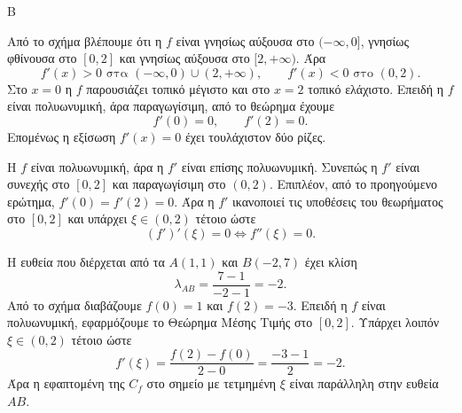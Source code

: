 

\begin{thema}{Β}
\begin{erwthma}
\item Από το σχήμα βλέπουμε ότι η $f$ είναι γνησίως αύξουσα στο $(-\infty,0]$, γνησίως φθίνουσα στο $[0,2]$ και γνησίως αύξουσα στο $[2,+\infty)$. Άρα
\[
f'(x)>0 \text{ στα } (-\infty,0)\cup(2,+\infty),\qquad
f'(x)<0 \text{ στο } (0,2).
\]
Στο $x=0$ η $f$ παρουσιάζει τοπικό μέγιστο και στο $x=2$ τοπικό ελάχιστο. Επειδή η $f$ είναι πολυωνυμική, άρα παραγωγίσιμη, από το θεώρημα  έχουμε
\[
f'(0)=0,\qquad f'(2)=0.
\]
Επομένως η εξίσωση $f'(x)=0$ έχει τουλάχιστον δύο ρίζες.

\item Η $f$ είναι πολυωνυμική, άρα η $f'$ είναι επίσης πολυωνυμική. Συνεπώς η $f'$ είναι συνεχής στο $[0,2]$ και παραγωγίσιμη στο $(0,2)$. Επιπλέον, από το προηγούμενο ερώτημα, $f'(0)=f'(2)=0$. Άρα η $f'$ ικανοποιεί τις υποθέσεις του θεωρήματος  στο $[0,2]$ και υπάρχει $\xi\in(0,2)$ τέτοιο ώστε
\[
(f')'(\xi)=0\Leftrightarrow f''(\xi)=0.
\]

\item Η ευθεία που διέρχεται από τα $A(1,1)$ και $B(-2,7)$ έχει κλίση
\[
\lambda_{AB}=\frac{7-1}{-2-1}=-2.
\]
Από το σχήμα διαβάζουμε $f(0)=1$ και $f(2)=-3$. Επειδή η $f$ είναι πολυωνυμική, εφαρμόζουμε το Θεώρημα Μέσης Τιμής στο $[0,2]$. Υπάρχει λοιπόν $\xi\in(0,2)$ τέτοιο ώστε
\[
f'(\xi)=\frac{f(2)-f(0)}{2-0}=\frac{-3-1}{2}=-2.
\]
Άρα η εφαπτομένη της $C_f$ στο σημείο με τετμημένη $\xi$ είναι παράλληλη στην ευθεία $AB$.
\end{erwthma}
\end{thema}



